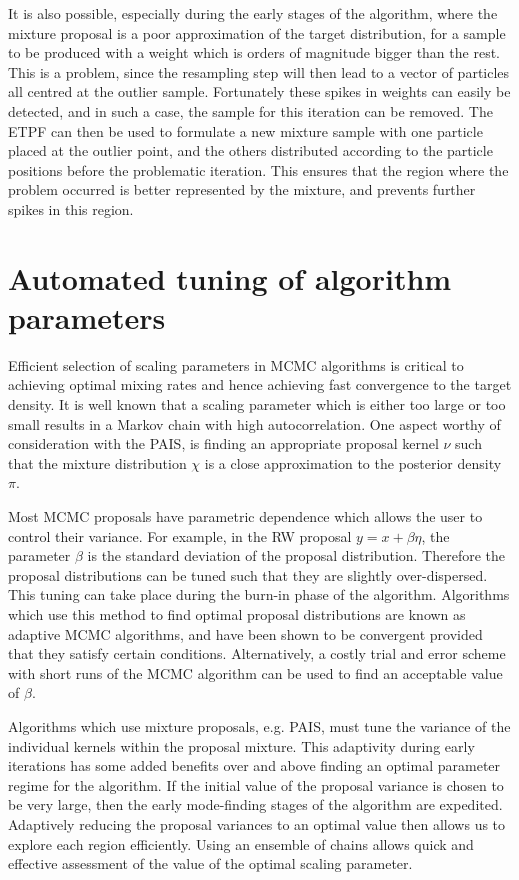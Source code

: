 \documentclass[final]{siamltex}
\begin{document}
It is also possible, especially during the early stages of the
algorithm, where the mixture proposal is a poor approximation of the
target distribution, for a sample to be produced with a weight which
is orders of magnitude bigger than the rest. This is a problem, since
the resampling step will then lead to a vector of particles all
centred at the outlier sample. Fortunately these spikes in weights can
easily be detected, and in such a case, the sample for this iteration
can be removed. The ETPF can then be used to formulate a new mixture
sample with one particle placed at the outlier point, and the others
distributed according to the particle positions before the problematic
iteration. This ensures that the region where the problem occurred is
better represented by the mixture, and prevents further spikes in this region.


\section{Automated tuning of algorithm parameters}\label{Sec:adapt}

Efficient selection of scaling parameters in MCMC algorithms is
critical to achieving optimal mixing rates and hence achieving fast
convergence to the target density. It is well known that a scaling
parameter which is either too large or too small results in a Markov
chain with high autocorrelation. One aspect worthy of consideration
with the PAIS, is finding an appropriate proposal kernel $\nu$ such
that the mixture distribution $\chi$ is a close approximation to the
posterior density $\pi$.

Most MCMC proposals have parametric dependence which
allows the user to control their variance. For example, in the RW
proposal $y = x + \beta \eta$, the parameter $\beta$ is the standard deviation
of the proposal distribution. Therefore the proposal distributions can
be tuned such that they are slightly over-dispersed. This tuning
can take place during the burn-in phase of the algorithm. Algorithms
which use this method to find optimal proposal distributions are known
as adaptive MCMC algorithms, and have been shown to be convergent
provided that they satisfy certain
conditions\cite{roberts2007coupling,roberts2009examples}.
Alternatively, a costly trial and error scheme with short runs of the
MCMC algorithm can be used to find an acceptable value of $\beta$.

Algorithms which use mixture proposals, e.g. PAIS, must tune the
variance of the individual kernels within the proposal mixture. This
adaptivity during early iterations has some added benefits over and above
finding an optimal parameter regime for the algorithm. If the initial
value of the proposal variance is chosen to be very large, then the early
mode-finding stages of the algorithm are expedited. Adaptively
reducing the proposal variances to an optimal value then allows us to
explore each region efficiently. Using an ensemble of chains allows
quick and effective assessment of the value of the optimal scaling
parameter.
\end{document}
